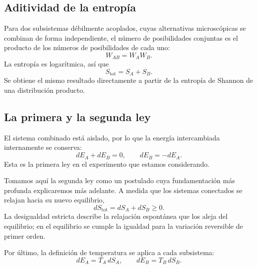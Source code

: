 \subsection{Aditividad de la entropía}

Para dos subsistemas débilmente acoplados, cuyas alternativas microscópicas se combinan de forma independiente, el número de posibilidades conjuntas es el producto de los números de posibilidades de cada uno:
\[
 W_{AB}=W_AW_B.
\]
La entropía es logarítmica, así que
\begin{equation}
 S_{\mathrm{tot}}=S_A+S_B.
 \label{eq:sm2-entropy-additivity}
\end{equation}
Se obtiene el mismo resultado directamente a partir de la entropía de Shannon de una distribución producto.

\begin{classroomqa}
\end{classroomqa}

\subsection{La primera y la segunda ley}

El sistema combinado está aislado, por lo que la energía intercambiada internamente se conserva:
\begin{equation}
 dE_A+dE_B=0,
 \qquad
 dE_B=-dE_A.
 \label{eq:sm2-first-law}
\end{equation}
Esta es la primera ley en el experimento que estamos considerando.

Tomamos aquí la segunda ley como un postulado cuya fundamentación más profunda explicaremos más adelante. A medida que los sistemas conectados se relajan hacia su nuevo equilibrio,
\begin{equation}
 dS_{\mathrm{tot}}=dS_A+dS_B\geq0.
 \label{eq:sm2-second-law}
\end{equation}
La desigualdad estricta describe la relajación espontánea que los aleja del equilibrio; en el equilibrio se cumple la igualdad para la variación reversible de primer orden.

Por último, la definición de temperatura se aplica a cada subsistema:
\begin{equation}
 dE_A=T_A\,dS_A,
 \qquad
 dE_B=T_B\,dS_B.
 \label{eq:sm2-two-temperatures}
\end{equation}

